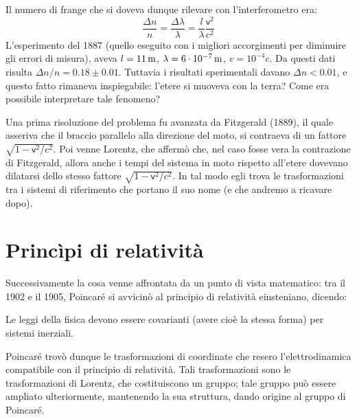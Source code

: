 Il numero di frange che si doveva dunque rilevare con l'interferometro
era:
\begin{displaymath}
  \frac{\Delta n}{n} = 
  \frac{\Delta\lambda}{\lambda}=\frac{l}{\lambda}\frac{\mathsf{v}^2}{c^2}
\end{displaymath}
L'esperimento del 1887 (quello eseguito con i migliori accorgimenti
per diminuire gli errori di misura), aveva $l=\unit[11]{m}$,
$\lambda=\unit[6\cdot10^{-7}]{m}$, $v=10^{-4}c$. Da questi dati
risulta $\Delta n / n =0.18 \pm 0.01$. Tuttavia i risultati
sperimentali davano $\Delta n < 0.01$, e  questo fatto rimaneva inspiegabile:
l'etere si muoveva con la terra? Come era possibile interpretare tale
fenomeno?
\begin{observazione} Una prima risoluzione del
  problema fu avanzata da Fitzgerald (1889), il quale asseriva che il
  braccio parallelo alla direzione del moto, si contraeva di un
  fattore $\sqrt{1-\mathsf{v}^2/c^2}$. Poi venne Lorentz, che
  afferm\`o che, nel caso fosse vera la contrazione di Fitzgerald,
  allora anche i tempi del sistema in moto rispetto all'etere dovevano
  dilatarsi dello stesso fattore $\sqrt{1-\mathsf{v}^2/c^2}$. In tal
  modo egli trova le trasformazioni tra i sistemi di riferimento che
  portano il suo nome (e che andremo a ricavare dopo).
\end{observazione}
\section{Princ\`ipi di relativit\`a}
Successivamente la cosa venne affrontata da un punto di vista
matematico: tra il 1902 e il 1905, Poincar\'e si avvicin\`o al
principio di relativit\`a einsteniano, dicendo:
\begin{principio}
  Le leggi della fisica devono essere covarianti (avere cio\`e la
  stessa forma) per sistemi inerziali.
\end{principio}
Poincar\'e trov\`o dunque le trasformazioni di coordinate che resero
l'elettrodinamica compatibile con il principio di relativit\`a. Tali
trasformazioni sono le trasformazioni di Lorentz, che costituiscono un
gruppo; tale gruppo pu\`o essere ampliato ulteriormente, mantenendo la
sua struttura, dando origine al gruppo di Poincar\'e.

